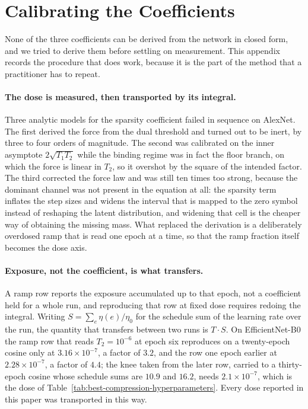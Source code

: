 \documentclass{article}
\begin{document}
\section{Calibrating the Coefficients}
\label{app:hyper}

None of the three coefficients can be derived from the network in closed form,
and we tried to derive them before settling on measurement. This appendix records
the procedure that does work, because it is the part of the method that a
practitioner has to repeat.

\paragraph{The dose is measured, then transported by its integral.}
Three analytic models for the sparsity coefficient failed in sequence on AlexNet.
The first derived the force from the dual threshold and turned out to be inert,
by three to four orders of magnitude. The second was calibrated on the inner
asymptote $2\sqrt{T_1T_2}$ while the binding regime was in fact the floor branch,
on which the force is linear in $T_2$, so it overshot by the square of the
intended factor. The third corrected the force law and was still ten times too
strong, because the dominant channel was not present in the equation at all: the
sparsity term inflates the step sizes and widens the interval that is mapped to
the zero symbol instead of reshaping the latent distribution, and widening that
cell is the cheaper way of obtaining the missing mass. What replaced the
derivation is a deliberately overdosed ramp that is read one epoch at a time, so
that the ramp fraction itself becomes the dose axis.

\paragraph{Exposure, not the coefficient, is what transfers.}
A ramp row reports the exposure accumulated up to that epoch, not a coefficient
held for a whole run, and reproducing that row at fixed dose requires redoing the
integral. Writing $S=\sum_e \eta(e)/\eta_0$ for the schedule sum of the learning
rate over the run, the quantity that transfers between two runs is $T\cdot S$.
On EfficientNet-B0 the ramp row that reads $T_2=10^{-6}$ at epoch six reproduces
on a twenty-epoch cosine only at $3.16\times10^{-7}$, a factor of $3.2$, and the
row one epoch earlier at $2.28\times10^{-7}$, a factor of $4.4$; the knee taken
from the later row, carried to a thirty-epoch cosine whose schedule sums are
$10.9$ and $16.2$, needs $2.1\times10^{-7}$, which is the dose of
Table~\ref{tab:best-compression-hyperparameters}. Every dose reported in this
paper was transported in this way.
\end{document}
